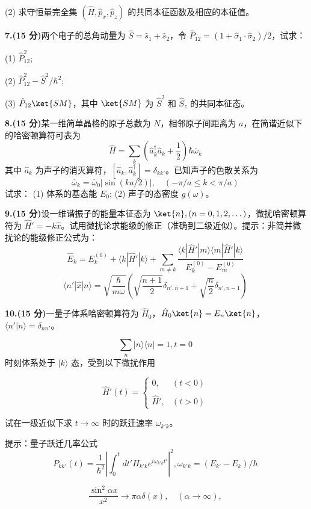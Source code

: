 (2) 求守恒量完全集 $(\hat{H}, \hat{p}_x, \hat{p}_z)$ 的共同本征函数及相应的本征值。

\textbf{7.(15 分)}两个电子的总角动量为 $\hat{S} = \hat{s}_1 + \hat{s}_2$，令 $\hat{P}_{12} = (1 + \hat{\sigma}_1 \cdot \hat{\sigma}_2)/2$，试求：

(1) $\hat{P}_{12}^2$;

(2) $\hat{P}_{12}^2 - \hat{S}^2/\hbar^2$;

(3) $\hat{P}_{12} \ket{SM}$，其中 $\ket{SM}$ 为 $\hat{S}^2$ 和 $\hat{S}_z$ 的共同本征态。

\textbf{8.(15 分)}某一维简单晶格的原子总数为 $N$，相邻原子间距离为 $a$，在简谐近似下的哈密顿算符可表为
$$\hat{H} = \sum_k \left(\hat a_k^\dagger \hat a_k + \frac{1}{2}\right)\hbar \overline{\omega}_k~$$
其中 $\hat a_k$ 为声子的消灭算符，$[\hat a_k, \hat a_k^\dagger] = \delta_{kk'}$。已知声子的色散关系为
$$\overline{\omega}_k = \overline{\omega}_0 |\sin(ka/2)|, \quad (-\pi/a \leq k < \pi/a)~$$
试求：
(1) 体系的基态能 $E_0$;
(2) 声子的态密度 $g(\omega)$。

\textbf{9.(15 分)}设一维谐振子的能量本征态为 $\ket{n}, (n = 0, 1, 2, \dots)$，微扰哈密顿算符为 $\hat{H}' = -k\hat{x}$。试用微扰论求能级的修正（准确到二级近似）。提示：非简并微扰论的能级修正公式为：
$$\hat{E}_k = E_k^{(0)} + \langle k|\hat{H}'|k\rangle + \sum_{m\neq k} \frac{\langle k|\hat{H}'|m\rangle \langle m|\hat{H}'|k\rangle}{E_k^{(0)} - E_m^{(0)}}~$$
$$\langle n'|\hat{x}|n \rangle = \sqrt{\frac{\hbar}{m\omega}} \left( \sqrt{\frac{n+1}{2}} \delta_{n',n+1} + \sqrt{\frac{n}{2}} \delta_{n',n-1} \right)~$$ 

\textbf{10.(15 分)}一量子体系哈密顿算符为 $\hat{H}_0$，$\hat{H}_0\ket{n} = E_n \ket{n}$，$\langle n'|n\rangle = \delta_{nn'}$。

$$\sum_n |n\rangle \langle n| = 1, t = 0~$$
时刻体系处于 $|k\rangle$ 态，受到以下微扰作用

$$\hat{H}'(t) = \begin{cases} 0, & (t < 0) \\\\\hat{H}', & (t > 0) \end{cases}~$$

试在一级近似下求 $t \rightarrow \infty$ 时的跃迁速率 $\omega_{k'k}$。

提示：量子跃迁几率公式
$$P_{kk'}(t) = \frac{1}{\hbar^2} \left| \int_0^t dt' H_{k'k} e^{i \omega_{k'k} t'} \right|^2,\omega_{k'k} = (E_{k'} - E_k)/\hbar ~$$


$$\frac{\sin^2 \alpha x}{x^2} \rightarrow \pi \alpha \delta(x), \quad (\alpha \rightarrow \infty),~$$